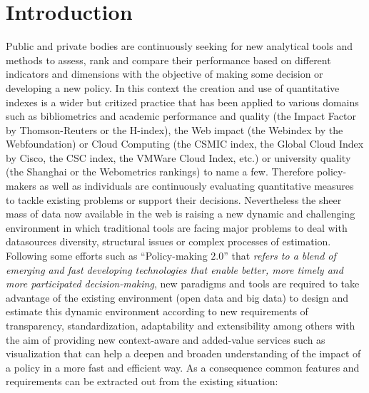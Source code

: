 \documentclass{llncs}
\begin{document}
\section{Introduction}
Public and private bodies are continuously seeking for new analytical tools and methods to assess, rank and compare their performance based 
on different indicators and dimensions with the objective of making some decision or developing a new policy. 
In this context the creation and use of quantitative indexes is a wider but critized practice that has been applied to various 
domains such as bibliometrics and academic performance and quality (the Impact Factor by Thomson-Reuters or the H-index), 
the Web impact (the Webindex by the Webfoundation) or Cloud Computing (the CSMIC index, the Global Cloud Index by Cisco, the CSC index, 
the VMWare Cloud Index, etc.) or university quality (the Shanghai or the Webometrics rankings) to name a few. 
Therefore policy-makers as well as individuals are continuously evaluating quantitative measures to tackle 
existing problems or support their decisions. Nevertheless the sheer mass of data now available in the web is 
raising a new dynamic and challenging environment in which traditional tools are facing major 
problems to deal with datasources diversity, structural issues or complex processes of estimation. Following some efforts 
such as ``Policy-making $2.0$'' that \textit{refers to a blend of emerging and fast developing technologies 
that enable better, more timely and more participated decision-making}, new paradigms and tools are required to take advantage of 
the existing environment (open data and big data) to design and estimate this dynamic environment according to new requirements of 
transparency, standardization, adaptability and extensibility among others with the aim of providing new context-aware 
and added-value services such as visualization that can help a deepen and broaden understanding of the impact of a 
policy in a more fast and efficient way. As a consequence common features and requirements can be extracted out from the existing situation:
\end{document}
